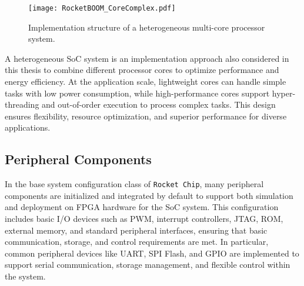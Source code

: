 

\begin{figure}[h!]
    \centering
    \texttt{[image: RocketBOOM\_CoreComplex.pdf]} %
    \caption{Implementation structure of a heterogeneous multi-core processor system.}
    \label{fig:heterogeneous_cores_system}
\end{figure}

A heterogeneous SoC system is an implementation approach also considered in this thesis to combine different processor cores to optimize performance and energy efficiency. At the application scale, lightweight cores can handle simple tasks with low power consumption, while high-performance cores support hyper-threading and out-of-order execution to process complex tasks. This design ensures flexibility, resource optimization, and superior performance for diverse applications.

\subsection{Peripheral Components}
\label{subsec:peripheral_components}

In the base system configuration class of \texttt{Rocket Chip}, many peripheral components are initialized and integrated by default to support both simulation and deployment on FPGA hardware for the SoC system. This configuration includes basic I/O devices such as PWM, interrupt controllers, JTAG, ROM, external memory, and standard peripheral interfaces, ensuring that basic communication, storage, and control requirements are met. In particular, common peripheral devices like UART, SPI Flash, and GPIO are implemented to support serial communication, storage management, and flexible control within the system.

